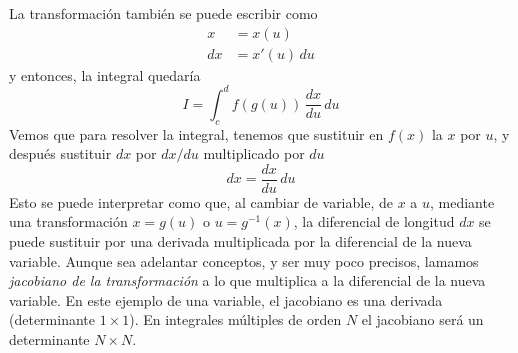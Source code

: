 La transformación también se puede escribir como
\begin{align}
  x &= x(u)\\
  dx &= x'(u)\,du
\end{align}
y entonces, la integral quedaría
\begin{equation}
  I = \int_c^d\!f(g(u))\,\dfrac{dx}{du}\,du
\end{equation}
Vemos que para resolver la integral, tenemos que sustituir en $f(x)$ la $x$ por $u$, y
después sustituir $dx$ por $dx/du$ multiplicado por $du$
\begin{equation}
  dx = \dfrac{dx}{du}\,du
\end{equation}
Esto se puede interpretar como que, al cambiar de variable, de $x$ a $u$, mediante una
transformación $x=g(u)$ o $u=g^{-1}(x)$, la diferencial de longitud $dx$ se puede
sustituir por una derivada multiplicada por la diferencial de la nueva variable.
Aunque sea adelantar conceptos, y ser muy poco precisos, lamamos
\emph{jacobiano de la transformación} a lo que multiplica a la diferencial de la nueva
variable.
En este ejemplo de una variable, el jacobiano es una derivada (determinante $1\times 1$).
En integrales múltiples de orden $N$ el jacobiano será un determinante $N\times N$.






